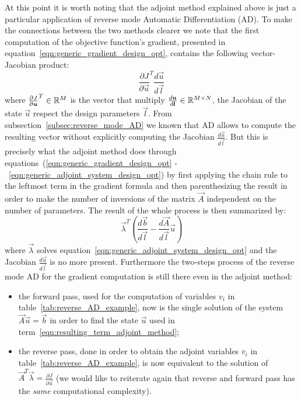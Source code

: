 \bigskip
At this point it is worth noting that the adjoint method explained above is just a particular application of reverse mode Automatic Differentiation (AD). To make the connections between the two methods clearer we note that the first computation of the  objective function's gradient, presented in equation~\eqref{eqn:generic_gradient_design_opt}, contains the following vector-Jacobian product:
\begin{equation}
	\label{eqn:vJp_design_opt}
	\frac{\partial J}{\partial \vec{u}}^T \frac{d\vec{u}}{d\vec{l}}
\end{equation}
where $\frac{\partial J}{\partial \boldsymbol{u}}^T \in \mathbb{R}^M$ is the vector that multiply $\frac{d\boldsymbol{u}}{d\boldsymbol{l}} \in \mathbb{R}^{M \times N}$, the Jacobian of the state $\vec{u}$ respect the design parameters $\vec{l}$.
From subsection~\vref{subsec:reverse_mode_AD} we known that AD allows to compute the resulting vector without explicitly computing the Jacobian $\frac{d\vec{u}}{d\vec{l}}$. But this is precisely what the adjoint method does through equations~(\ref{eqn:generic_gradient_design_opt} -~\ref{eqn:generic_adjoint_system_design_opt}) by first applying the chain rule to the leftmost term in the gradient formula and then parenthesizing the result in order to make the number of inversions of the matrix $\vec{A}$ independent on the number of parameters.
The result of the whole process is then summarized by:
\begin{equation}
	\label{eqn:resulting_term_adjoint_method}
	\vec{\lambda}^T \left( \frac{d\vec{b}}{d\vec{l}} - \frac{d\vec{A}}{d\vec{l}}\vec{u} \right)
\end{equation}
where $\vec{\lambda}$ solves equation~\eqref{eqn:generic_adjoint_system_design_opt} and the Jacobian $\frac{d\vec{u}}{d\vec{l}}$ is no more present. Furthermore the two-steps process of the reverse mode AD for the gradient computation is still there even in the adjoint method:
\begin{itemize}
	\item the forward pass, used for the computation of variables $v_i$ in table~\ref{tab:reverse_AD_example}, now is the single solution of the system $\vec{A}\vec{u}=\vec{b}$ in order to find the state $\vec{u}$ used in term~\eqref{eqn:resulting_term_adjoint_method};
	\item the reverse pass, done in order to obtain the adjoint variables $\overline{v}_i$ in table~\ref{tab:reverse_AD_example}, is now equivalent to the solution of $\vec{A}^T \vec{\lambda} = \frac{\partial J}{\partial \vec{u}}$ (we would like to reiterate again that reverse and forward pass has the \emph{same} computational complexity). 
\end{itemize}

